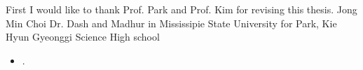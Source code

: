 \begin{acknowledgements}
First I would like to thank Prof. Park and Prof. Kim for revising this thesis. Jong Min Choi
Dr. Dash and Madhur in Mississipie State University for 
Park, Kie Hyun
Gyeonggi Science High school 

\end{acknowledgements}

\begin{researches}
\begin{itemize}
\item{.}
\end{itemize}
\end{researches}
